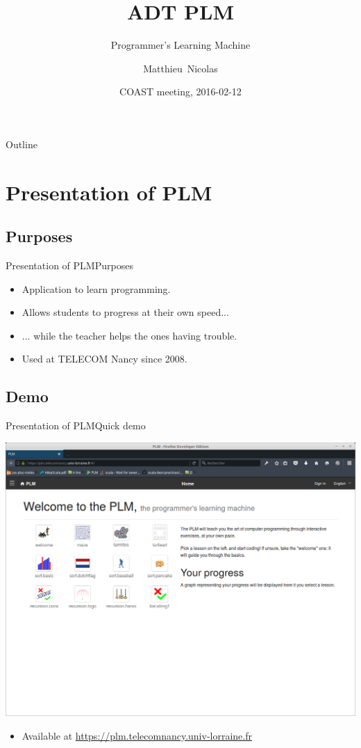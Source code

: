 \documentclass{beamer}
\title{ADT PLM}
\subtitle{Programmer's Learning Machine}
\author{Matthieu~Nicolas}
\date{COAST meeting, 2016-02-12}
\begin{document}
\begin{frame}
  \titlepage
\end{frame}

\begin{frame}{Outline}
  \tableofcontents
\end{frame}

\section{Presentation of PLM}

\subsection{Purposes}

\begin{frame}{Presentation of PLM}{Purposes}
  \begin{itemize}
  \item {
    Application to learn programming.
    \pause
  }
  \item {
    Allows students to progress at their own speed...
    \pause
  }
  \item {
    ... while the teacher helps the ones having trouble.
    \pause
  }
  \item {
    Used at TELECOM Nancy since 2008.
  }
  \end{itemize}
\end{frame}

\subsection{Demo}

\begin{frame}{Presentation of PLM}{Quick demo}
  \begin{center}
    \href{https://plm.telecomnancy.univ-lorraine.fr}{\includegraphics[scale=0.16]{img/screen-webPLM-1.png}}
    \begin{itemize}
    \item Available at \url{https://plm.telecomnancy.univ-lorraine.fr}
    \end{itemize}
  \end{center}
\end{frame}
\end{document}

